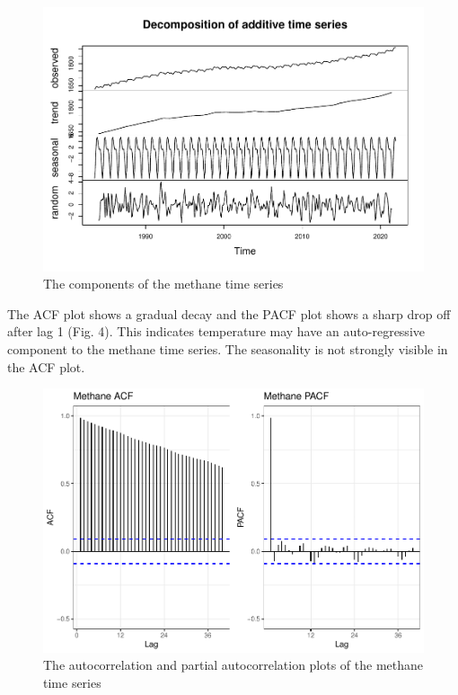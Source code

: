\documentclass[
]{article}
\begin{document}
\begin{figure}
\centering
\includegraphics{Final_Report_files/figure-latex/unnamed-chunk-6-1.pdf}
\caption{The components of the methane time series}
\end{figure}

The ACF plot shows a gradual decay and the PACF plot shows a sharp drop
off after lag 1 (Fig. 4). This indicates temperature may have an
auto-regressive component to the methane time series. The seasonality is
not strongly visible in the ACF plot.

\begin{figure}
\centering
\includegraphics{Final_Report_files/figure-latex/unnamed-chunk-7-1.pdf}
\caption{The autocorrelation and partial autocorrelation plots of the
methane time series}
\end{figure}
\end{document}

